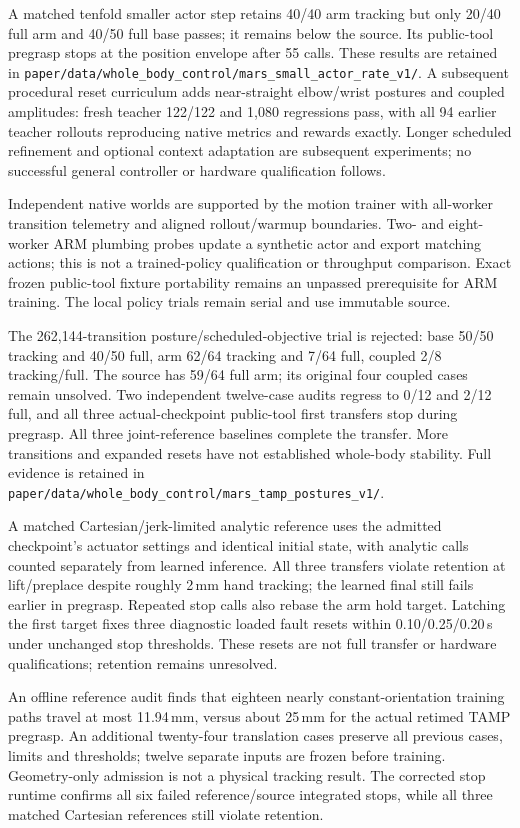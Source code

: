 A matched tenfold smaller actor step retains 40/40 arm tracking but only 20/40
full arm and 40/50 full base passes; it remains below the source. Its public-tool
pregrasp stops at the position envelope after 55 calls. These results are retained
in \texttt{paper/data/whole\_body\_control/mars\_small\_actor\_rate\_v1/}.
A subsequent procedural reset curriculum adds near-straight elbow/wrist postures
and coupled amplitudes: fresh teacher 122/122 and 1,080 regressions pass, with
all 94 earlier teacher rollouts reproducing native metrics and rewards exactly.
Longer scheduled refinement and optional context adaptation are subsequent
experiments; no successful general controller or hardware qualification follows.


Independent native worlds are supported by the motion trainer with all-worker
transition telemetry and aligned rollout/warmup boundaries. Two- and eight-worker
ARM plumbing probes update a synthetic actor and export matching actions; this
is not a trained-policy qualification or throughput comparison. Exact frozen
public-tool fixture portability remains an unpassed prerequisite for ARM
training. The local policy trials remain serial and use immutable source.


The 262,144-transition posture/scheduled-objective trial is rejected: base
50/50 tracking and 40/50 full, arm 62/64 tracking and 7/64 full, coupled 2/8
tracking/full. The source has 59/64 full arm; its original four coupled cases
remain unsolved. Two independent twelve-case audits regress to 0/12 and 2/12
full, and all three actual-checkpoint public-tool first transfers stop during
pregrasp. All three joint-reference baselines complete the transfer. More
transitions and expanded resets have not established whole-body stability.
Full evidence is retained in
\texttt{paper/data/whole\_body\_control/mars\_tamp\_postures\_v1/}.


A matched Cartesian/jerk-limited analytic reference uses the admitted
checkpoint's actuator settings and identical initial state, with analytic calls
counted separately from learned inference. All three transfers violate retention
at lift/preplace despite roughly 2\,mm hand tracking; the learned final still
fails earlier in pregrasp. Repeated stop calls also rebase the arm hold target.
Latching the first target fixes three diagnostic loaded fault resets within
0.10/0.25/0.20\,s under unchanged stop thresholds. These resets are not full
transfer or hardware qualifications; retention remains unresolved.

An offline reference audit finds that eighteen nearly constant-orientation
training paths travel at most 11.94\,mm, versus about 25\,mm for the actual
retimed TAMP pregrasp. An additional twenty-four translation cases preserve
all previous cases, limits and thresholds; twelve separate inputs are frozen
before training. Geometry-only admission is not a physical tracking result.
The corrected stop runtime confirms all six failed reference/source integrated
stops, while all three matched Cartesian references still violate retention.

